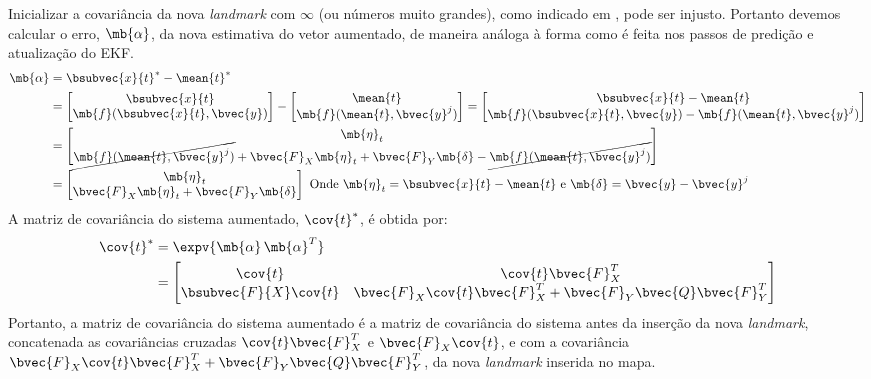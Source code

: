 Inicializar a covariância da nova \textit{landmark} com $\infty$ (ou 
números muito grandes), como indicado em 
\cite[p.~317]{bongard2006probabilistic}, pode ser injusto. Portanto devemos 
calcular o erro, $\mb{\alpha}$, da nova estimativa do vetor aumentado, de 
maneira análoga à forma como é feita nos passos de predição e atualização 
do EKF. 
\begin{equation}
\begin{aligned}
   \mb{\alpha} &= \bsubvec{x}{t}^* - \mean{t}^*\\
   &= \begin{bmatrix}
       \bsubvec{x}{t} \\ \mb{f}(\bsubvec{x}{t}, \bvec{y})
   \end{bmatrix} - \begin{bmatrix}
       \mean{t} \\ \mb{f}(\mean{t}, \bvec{y}^j)
   \end{bmatrix} = \begin{bmatrix}
       \bsubvec{x}{t} - \mean{t}\\
       \mb{f}(\bsubvec{x}{t}, \bvec{y}) - \mb{f}(\mean{t}, \bvec{y}^j)
   \end{bmatrix}\\
   &= \begin{bmatrix}
       \mb{\eta}_t \\
       \cancel{\mb{f}(\mean{t}, \bvec{y}^j)} + 
       \bvec{F}_X \mb{\eta}_t + \bvec{F}_Y \mb{\delta}
       - \cancel{\mb{f}(\mean{t}, \bvec{y}^j)}
   \end{bmatrix} \\
    &= \begin{bmatrix}
       \mb{\eta}_t \\
       \bvec{F}_X \mb{\eta}_t + \bvec{F}_Y \mb{\delta} 
   \end{bmatrix} \text{ Onde $\mb{\eta}_t = \bsubvec{x}{t} - \mean{t}$ e $\mb{\delta} = \bvec{y} - \bvec{y}^j$}
\end{aligned}
\end{equation}
A matriz de covariância do sistema aumentado, $\cov{t}^*$, é obtida por:
\renewcommand{\arraystretch}{1.5}
\newcommand{\eqCovarianceAugmented}{\begin{bmatrix}
       \cov{t} & \cov{t} \bvec{F}_X^T\\
       \bsubvec{F}{X} \cov{t} &  \bvec{F}_X \cov{t} \bvec{F}_X^T 
       + \bvec{F}_Y \bvec{Q} \bvec{F}_Y^T
    \end{bmatrix}}
\begin{equation}
\begin{aligned}
  \cov{t}^* &= \expv{\mb{\alpha} \,\mb{\alpha}^T} \\
  &= \eqCovarianceAugmented
\end{aligned}
\label{eq:ekf-landmark-insertion-covariance}
\end{equation}
\renewcommand{\arraystretch}{1}
Portanto, a matriz de covariância do sistema aumentado é a matriz de 
covariância do sistema antes da inserção da nova \textit{landmark}, 
concatenada as covariâncias cruzadas $\cov{t} \bvec{F}_X^T$ e $\bvec{F}_X \cov{t}$, e com a covariância $\bvec{F}_X \cov{t} \bvec{F}_X^T + \bvec{F}_Y 
\bvec{Q} \bvec{F}_Y^T$, da nova \textit{landmark} inserida no mapa. 

